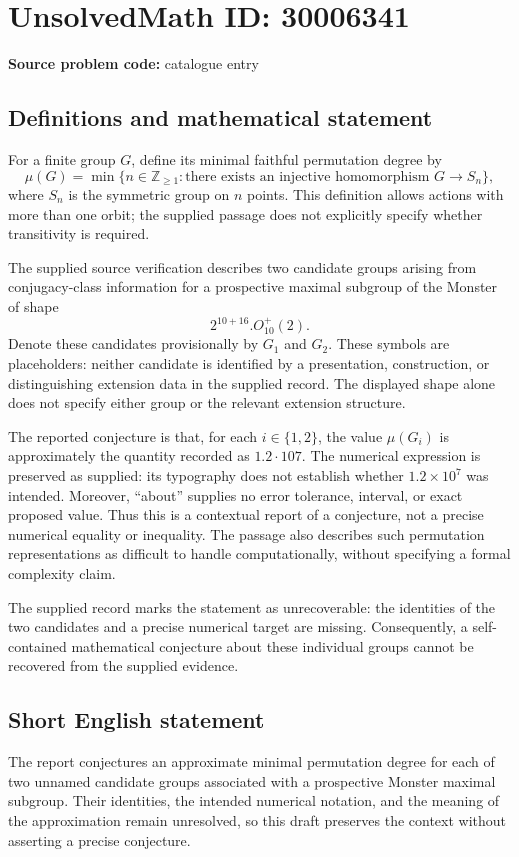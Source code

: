 \documentclass[11pt]{article}
\newcommand{\Z}{\mathbb{Z}}
\begin{document}
\section*{UnsolvedMath ID: 30006341}
\textbf{Source problem code:} catalogue entry
\subsection{Definitions and mathematical statement}
For a finite group \(G\), define its minimal faithful permutation degree by
\[
\mu(G)=\min\{n\in\Z_{\geq 1}:\text{there exists an injective homomorphism }G\longrightarrow S_n\},
\]
where \(S_n\) is the symmetric group on \(n\) points. This definition allows actions with more than one orbit; the supplied passage does not explicitly specify whether transitivity is required.

The supplied source verification describes two candidate groups arising from conjugacy-class information for a prospective maximal subgroup of the Monster of shape
\[
2^{10+16}.O_{10}^{+}(2).
\]
Denote these candidates provisionally by \(G_1\) and \(G_2\). These symbols are placeholders: neither candidate is identified by a presentation, construction, or distinguishing extension data in the supplied record. The displayed shape alone does not specify either group or the relevant extension structure.

The reported conjecture is that, for each \(i\in\{1,2\}\), the value \(\mu(G_i)\) is approximately the quantity recorded as \(1.2\cdot107\). The numerical expression is preserved as supplied: its typography does not establish whether \(1.2\times10^7\) was intended. Moreover, ``about'' supplies no error tolerance, interval, or exact proposed value. Thus this is a contextual report of a conjecture, not a precise numerical equality or inequality. The passage also describes such permutation representations as difficult to handle computationally, without specifying a formal complexity claim.

The supplied record marks the statement as unrecoverable: the identities of the two candidates and a precise numerical target are missing. Consequently, a self-contained mathematical conjecture about these individual groups cannot be recovered from the supplied evidence.
\subsection{Short English statement}
The report conjectures an approximate minimal permutation degree for each of two unnamed candidate groups associated with a prospective Monster maximal subgroup. Their identities, the intended numerical notation, and the meaning of the approximation remain unresolved, so this draft preserves the context without asserting a precise conjecture.
\end{document}
